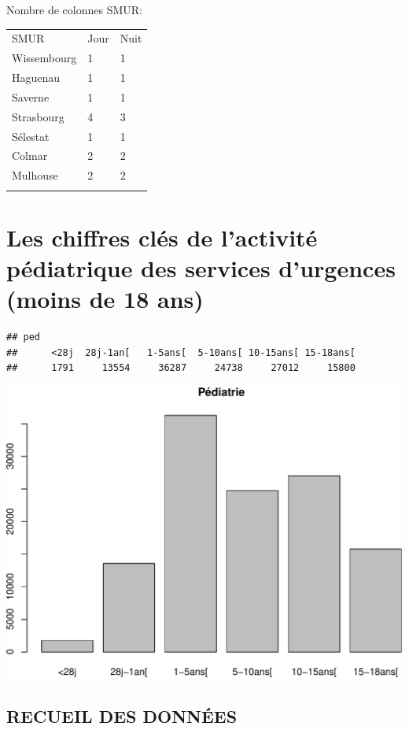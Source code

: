 \documentclass[]{article}
\begin{document}
Nombre de colonnes SMUR:

\begin{longtable}[c]{@{}lll@{}}
\toprule\addlinespace
SMUR & Jour & Nuit
\\\addlinespace
\midrule\endhead
Wissembourg & 1 & 1
\\\addlinespace
Haguenau & 1 & 1
\\\addlinespace
Saverne & 1 & 1
\\\addlinespace
Strasbourg & 4 & 3
\\\addlinespace
Sélestat & 1 & 1
\\\addlinespace
Colmar & 2 & 2
\\\addlinespace
Mulhouse & 2 & 2
\\\addlinespace
\bottomrule
\end{longtable}

\section{Les chiffres clés de l'activité pédiatrique des services
d'urgences (moins de 18
ans)}\label{les-chiffres-cles-de-lactivite-pediatrique-des-services-durgences-moins-de-18-ans}

\begin{verbatim}
## ped
##      <28j  28j-1an[   1-5ans[  5-10ans[ 10-15ans[ 15-18ans[ 
##      1791     13554     36287     24738     27012     15800
\end{verbatim}

\includegraphics{rapport2014_V4_files/figure-latex/pop18-1.pdf}

\subsection{RECUEIL DES DONNÉES}\label{recueil-des-donnees-1}
\end{document}
